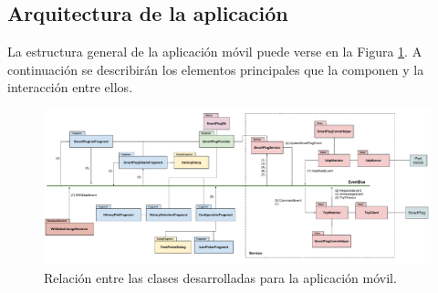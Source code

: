 \subsection{Arquitectura de la aplicación}
\label{subsec:arquitectura_app}

La estructura general de la aplicación móvil puede verse en la Figura \ref{fig:app_arquitectura}. A continuación se describirán los elementos principales que la componen y la interacción entre ellos.

\begin{figure}[h]
	\centering
	\includegraphics[width=15cm]{./Figures/3_3_2_app-arquitectura.pdf}
	\caption{Relación entre las clases desarrolladas para la aplicación móvil.}
	\label{fig:app_arquitectura}
\end{figure}

